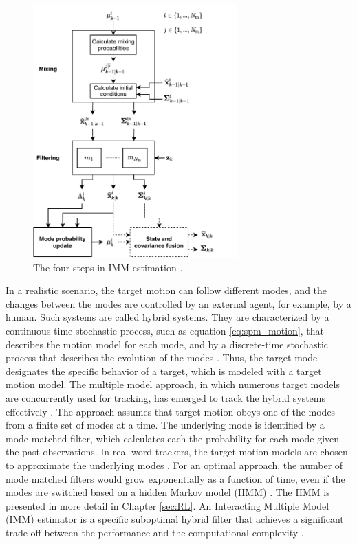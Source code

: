 \documentclass[english, 12pt, a4paper, elec, utf8, a-1b, online]{aaltothesis}
\begin{document}
\begin{figure}[b]
    \centering
    \includegraphics[width=0.7\textwidth]{figures/IMM.pdf}
    \caption{
    The four steps in IMM estimation \cite{BarShalom2001}.}
    \label{fig:IMM}
\end{figure}

In a realistic scenario, the target motion can follow different modes, and the changes between the modes are controlled by an external agent, for example, by a human.
Such systems are called hybrid systems. 
They are characterized by a continuous-time stochastic process, such as equation \eqref{eq:spm_motion}, that describes the motion model for each mode, and by a discrete-time stochastic process that describes the evolution of the modes \cite{BarShalom2001}.
Thus, the target mode designates the specific behavior of a target, which is modeled with a target motion model.
The multiple model approach, in which numerous target models are concurrently used for tracking, has emerged to track the hybrid systems effectively \cite{BarShalom2001}.
The approach assumes that target motion obeys one of the modes from a finite set of modes at a time.
The underlying mode is identified by a mode-matched filter, which calculates each the probability for each mode given the past observations.
In real-word trackers, the target motion models are chosen to approximate the underlying modes \cite{Simeonova2002}.
For an optimal approach, the number of mode matched filters would grow exponentially as a function of time, even if the modes are switched based on a hidden Markov model (HMM) \cite{BarShalom2001}.
The HMM is presented in more detail in Chapter \ref{sec:RL}.
An Interacting Multiple Model (IMM) estimator is a specific suboptimal hybrid filter that achieves a significant trade-off between the performance and the computational complexity \cite{BarShalom2001}.
\end{document}
